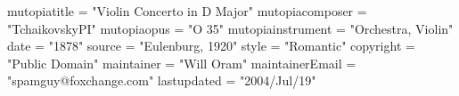  	mutopiatitle = "Violin Concerto in D Major"
 	mutopiacomposer = "TchaikovskyPI"
	mutopiaopus = "O 35"
 	mutopiainstrument = "Orchestra, Violin"
 	date = "1878"
 	source = "Eulenburg, 1920"
 	style = "Romantic"
 	copyright = "Public Domain"
 	maintainer = "Will Oram"
 	maintainerEmail = "spamguy@foxchange.com"
 	lastupdated = "2004/Jul/19"
